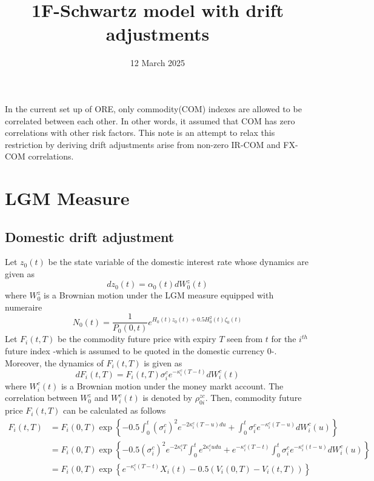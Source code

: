 \documentclass[]{article}
\title{1F-Schwartz model with drift adjustments}
\date{12 March 2025}
\begin{document}
\maketitle

In the current set up of ORE, only  commodity(COM) indexes are allowed to be correlated between each other. In other words, it assumed that COM has zero correlations with other risk factors. This note is an attempt to relax this restriction by deriving drift adjustments arise from non-zero IR-COM and FX-COM correlations.

\section{LGM Measure}
\subsection{Domestic drift adjustment}
Let $z_0(t)$ be the state variable of the domestic interest rate whose dynamics are given as 
%
$$
dz_0(t) = \alpha_0(t) dW^z_0(t)
$$
where $W^z_0$ is a Brownian motion under the LGM measure equipped with numeraire
%
\begin{equation}
N_0(t) = \frac{1}{P_0(0,t)} e^{H_0(t) z_0(t) + 0.5 H_0^2(t)\zeta_0(t)}\label{eq:N0t}
\end{equation}
%
Let $F_i(t,T)$ be the commodity future price with expiry $T$ seen from $t$ for the $i^{th}$ future index -which is assumed to be quoted in the domestic currency $0$-. Moreover, the dynamics of $F_i(t,T)$ is given as 
%
\begin{equation}
dF_i(t,T) = F_i(t,T) \sigma_i^c e^{-\kappa^c_i (T-t) }dW^c_i(t) \label{eq:FitT}
\end{equation}
%
where $W^c_i(t) $ is a Brownian motion under the money markt account. The correlation between  $W^z_0$  and  $W^c_i(t) $  is denoted by $\rho^{zc}_{0i }$. Then,  commodity future price $F_i(t,T)$ can be calculated as follows
%
\begin{align}
F_i(t,T) &= F_i(0,T) \exp\left\{-0.5\int_0^t \left(\sigma_i^c\right)^2 e^{-2\kappa_i^c(T-u) du} + \int_0^t\sigma_i^c e^{-\kappa_i^c(T-u)} dW^c_i(u)\right\} \nonumber\\
 &= F_i(0,T) \exp\left\{-0.5\left(\sigma_i^c\right)^2 e^{-2\kappa_i^c T}\int_0^t e^{2\kappa_i^c u du} + e^{-\kappa_i^c(T-t)} \int_0^t\sigma_i^c e^{-\kappa^c_i(t-u)} dW^c_i(u)\right\} \nonumber\\
 &= F_i(0,T) \exp\left\{ e^{-\kappa_i^c(T-t)} X_i(t) - 0.5 (V_i(0,T) - V_i(t,T))\right\} \nonumber
 \end{align}
\end{document}
